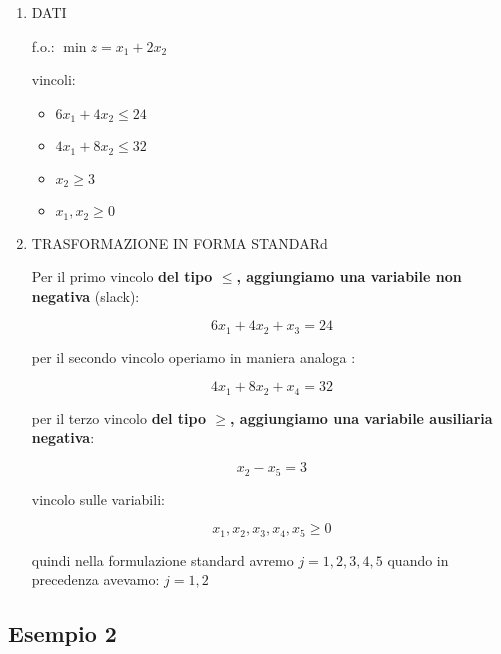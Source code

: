 \begin{enumerate}
	\item DATI
	
		f.o.: $\min z= x_1 + 2 x_2$

		vincoli:

		\begin{itemize}
			\item $6x_1 + 4x_2 \leq 24$
			\item $4x_1 + 8x_2 \leq 32$
			\item $x_2 \geq 3$
			\item $x_1, x_2 \geq 0$
		\end{itemize}
		
	\item TRASFORMAZIONE IN FORMA STANDARd
	
		Per il primo vincolo \textbf{del tipo $\leq$, aggiungiamo una variabile non negativa} (slack):

		$$6x_1 + 4x_2 + x_3 = 24$$

		per il secondo vincolo operiamo in maniera analoga :

		$$4x_1 + 8x_2 + x_4 = 32$$

		per il terzo vincolo \textbf{del tipo $\geq$, aggiungiamo una variabile ausiliaria negativa}:
		
		$$x_2 - x_5 = 3$$

		vincolo sulle variabili:

		$$x_1, x_2, x_3, x_4, x_5 \geq 0$$

		quindi nella formulazione standard avremo $j = 1,2,3,4,5$ quando in precedenza avevamo: $j = 1, 2$
	
\end{enumerate}


\subsection{Esempio 2}

